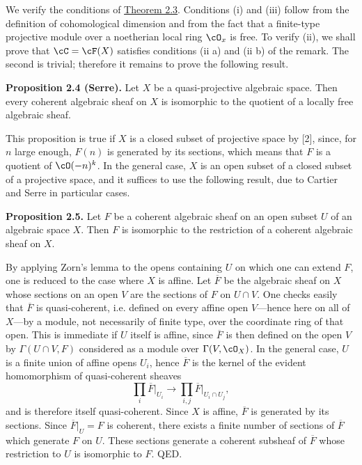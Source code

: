 We verify the conditions of \hyperlink{sga6.e00.thm.2-3}{Theorem 2.3}. Conditions (i) and (iii) follow from the definition of cohomological dimension and from the fact that a finite-type projective module over a noetherian local ring $\cO_x$ is free. To verify (ii), we shall prove that $\cC=\cF(X)$ satisfies conditions (ii a) and (ii b) of the remark. The second is trivial; therefore it remains to prove the following result.

\textbf{Proposition 2.4 (Serre).} Let $X$ be a quasi-projective algebraic space. Then every coherent algebraic sheaf on $X$ is isomorphic to the quotient of a locally free algebraic sheaf.

This proposition is true if $X$ is a closed subset of projective space by [2], since, for $n$ large enough, $F(n)$ is generated by its sections, which means that $F$ is a quotient of $\cO(-n)^k$. In the general case, $X$ is an open subset of a closed subset of a projective space, and it suffices to use the following result, due to Cartier and Serre in particular cases.

\textbf{Proposition 2.5.} Let $F$ be a coherent algebraic sheaf on an open subset $U$ of an algebraic space $X$. Then $F$ is isomorphic to the restriction of a coherent algebraic sheaf on $X$.

By applying Zorn's lemma to the opens containing $U$ on which one can extend $F$, one is reduced to the case where $X$ is affine. Let $\overline F$ be the algebraic sheaf on $X$ whose sections on an open $V$ are the sections of $F$ on $U\cap V$. One checks easily that $\overline F$ is quasi-coherent, i.e. defined on every affine open $V$---hence here on all of $X$---by a module, not necessarily of finite type, over the coordinate ring of that open. This is immediate if $U$ itself is affine, since $\overline F$ is then defined on the open $V$ by $\Gamma(U\cap V,F)$ considered as a module over $\Gamma(V,\cO_X)$. In the general case, $U$ is a finite union of affine opens $U_i$, hence $\overline F$ is the kernel of the evident homomorphism of quasi-coherent sheaves
\[
 \prod_i \overline F\big|_{U_i}\longrightarrow \prod_{i,j}\overline F\big|_{U_i\cap U_j},
\]
and is therefore itself quasi-coherent. Since $X$ is affine, $\overline F$ is generated by its sections. Since $\overline F|_U=F$ is coherent, there exists a finite number of sections of $\overline F$ which generate $F$ on $U$. These sections generate a coherent subsheaf of $\overline F$ whose restriction to $U$ is isomorphic to $F$. QED.

